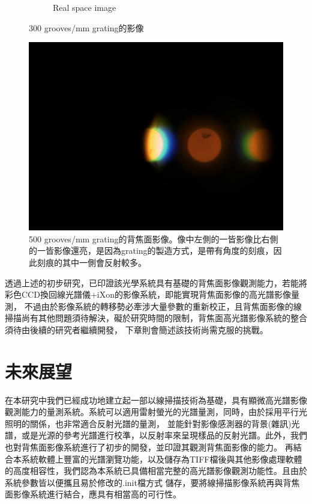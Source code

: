 \documentclass[12pt]{article}
\begin{document}
\begin{figure}[h]
\begin{subfigure}[b]{0.45\textwidth}
        \caption{Real space image}
        \label{fig: 300 real}
    \end{subfigure}
    \caption{300 grooves/mm grating的影像}
\end{figure}

\begin{figure}[h]
    \centering
    \includegraphics[width = 0.8\linewidth]{500bfp.jpeg}
    \caption[500 grooves/mm grating的背焦面影像]{500 grooves/mm grating的背焦面影像。像中左側的一皆影像比右側的一皆影像還亮，是因為grating的製造方式，是帶有角度的刻痕，因此刻痕的其中一側會反射較多。}
    \label{fig: 500 bfp}
\end{figure}

透過上述的初步研究，已印證該光學系統具有基礎的背焦面影像觀測能力，若能將彩色CCD換回線光譜儀+iXon的影像系統，即能實現背焦面影像的高光譜影像量測，
不過由於影像系統的轉移勢必牽涉大量參數的重新校正，且背焦面影像的線掃描尚有其他問題須待解決，礙於研究時間的限制，背焦面高光譜影像系統的整合須待由後續的研究者繼續開發，
下章則會簡述該技術尚需克服的挑戰。

\section{未來展望}
在本研究中我們已經成功地建立起一部以線掃描技術為基礎，具有顯微高光譜影像觀測能力的量測系統。系統可以適用雷射螢光的光譜量測，同時，由於採用平行光照明的關係，也非常適合反射光譜的量測，
並能針對影像感測器的背景(雜訊)光譜，或是光源的參考光譜進行校準，以反射率來呈現樣品的反射光譜。此外，我們也對背焦面影像系統進行了初步的開發，並印證其觀測背焦面影像的能力。
再結合本系統軟體上豐富的光譜瀏覽功能，以及儲存為TIFF檔後與其他影像處理軟體的高度相容性，我們認為本系統已具備相當完整的高光譜影像觀測功能性。且由於系統參數皆以便攜且易於修改的.init檔方式
儲存，要將線掃描影像系統再與背焦面影像系統進行結合，應具有相當高的可行性。
\end{document}
